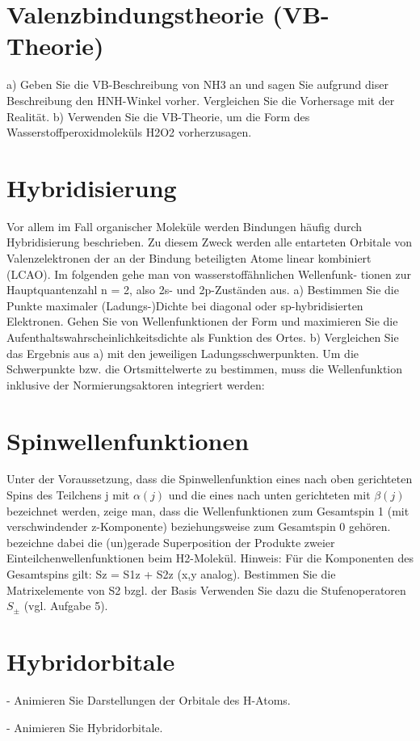 \section{Valenzbindungstheorie (VB-Theorie)}



a) Geben Sie die VB-Beschreibung von NH3 an und sagen Sie aufgrund diser Beschreibung den HNH-Winkel vorher. Vergleichen Sie die Vorhersage mit der Realität.
b) Verwenden Sie die VB-Theorie, um die Form des Wasserstoffperoxidmoleküls H2O2 vorherzusagen.

\section{Hybridisierung}

Vor allem im Fall organischer Moleküle werden Bindungen häufig durch Hybridisierung beschrieben. Zu diesem Zweck werden alle entarteten Orbitale von Valenzelektronen der an der Bindung beteiligten Atome linear kombiniert (LCAO). Im folgenden gehe man von wasserstoffähnlichen Wellenfunk- tionen %
zur Hauptquantenzahl n = 2, also 2s- und 2p-Zuständen aus.
a) Bestimmen Sie die Punkte maximaler (Ladungs-)Dichte bei diagonal oder sp-hybridisierten Elektronen. Gehen Sie von Wellenfunktionen der Form
und maximieren Sie die Aufenthaltswahrscheinlichkeitsdichte als Funktion des Ortes.
b) Vergleichen Sie das Ergebnis aus a) mit den jeweiligen Ladungsschwerpunkten. Um die Schwerpunkte bzw. die Ortsmittelwerte zu bestimmen, muss die Wellenfunktion inklusive der Normierungsaktoren integriert werden:
% 


\section{ Spinwellenfunktionen}

Unter der Voraussetzung, dass die Spinwellenfunktion eines nach oben gerichteten Spins des Teilchens j mit $\alpha(j)$ und die eines nach unten gerichteten mit $\beta(j)$ bezeichnet werden, zeige man, dass die Wellenfunktionen
zum Gesamtspin 1 (mit verschwindender z-Komponente) beziehungsweise zum Gesamtspin 0 gehören. %
 bezeichne dabei die (un)gerade Superposition der Produkte zweier Einteilchenwellenfunktionen beim H2-Molekül.
Hinweis: Für die Komponenten des Gesamtspins gilt:
 Sz = S1z + S2z (x,y analog). Bestimmen Sie die Matrixelemente von S2 bzgl. der Basis
 Verwenden Sie dazu die Stufenoperatoren $S_\pm$ (vgl. Aufgabe 5).
 
 
\section{ Hybridorbitale}
	- Animieren Sie Darstellungen der Orbitale des H-Atoms.
	
- Animieren Sie Hybridorbitale.


 